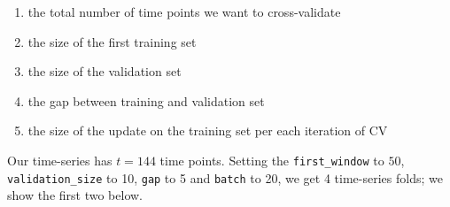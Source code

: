 \documentclass[12pt, krantz2,]{krantz}
\providecommand{\tightlist}{%
  \setlength{\itemsep}{0pt}\setlength{\parskip}{0pt}}
\theoremstyle{definition}
\theoremstyle{definition}
\theoremstyle{definition}
\newcommand{\1}{\mathbbm{1}}
\begin{document}
\begin{enumerate}
\def\labelenumi{\arabic{enumi}.}
\tightlist
\item
  the total number of time points we want to cross-validate
\item
  the size of the first training set
\item
  the size of the validation set
\item
  the gap between training and validation set
\item
  the size of the update on the training set per each iteration of CV
\end{enumerate}

Our time-series has \(t=144\) time points. Setting the \texttt{first\_window} to \(50\),
\texttt{validation\_size} to 10, \texttt{gap} to 5 and \texttt{batch} to 20, we get 4 time-series
folds; we show the first two below.
\end{document}
